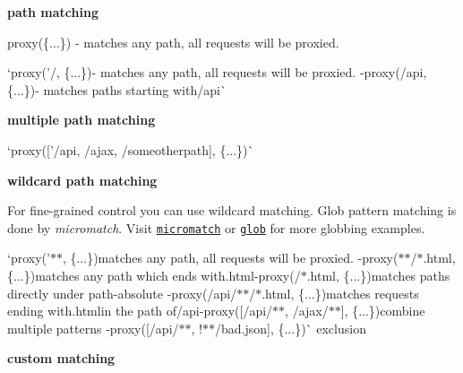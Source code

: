 \begin{DoxyItemize}
\item {\bfseries path matching}
\begin{DoxyItemize}
\item {\ttfamily proxy(\{...\})} -\/ matches any path, all requests will be proxied.
\item `proxy('/\textquotesingle{}, \{...\}){\ttfamily -\/ matches any path, all requests will be proxied. -\/}proxy(\textquotesingle{}/api\textquotesingle{}, \{...\}){\ttfamily -\/ matches paths starting with}/api\`{}
\end{DoxyItemize}
\item {\bfseries multiple path matching}
\begin{DoxyItemize}
\item `proxy(\mbox{[}'/api\textquotesingle{}, \textquotesingle{}/ajax\textquotesingle{}, \textquotesingle{}/someotherpath\textquotesingle{}\mbox{]}, \{...\})\`{}
\end{DoxyItemize}
\item {\bfseries wildcard path matching}

For fine-\/grained control you can use wildcard matching. Glob pattern matching is done by {\itshape micromatch}. Visit \href{https://www.npmjs.com/package/micromatch}{\tt micromatch} or \href{https://www.npmjs.com/package/glob}{\tt glob} for more globbing examples.
\begin{DoxyItemize}
\item `proxy('$\ast$$\ast$\textquotesingle{}, \{...\}){\ttfamily matches any path, all requests will be proxied. -\/}proxy(\textquotesingle{}$\ast$$\ast$/$\ast$.html\textquotesingle{}, \{...\}){\ttfamily matches any path which ends with}.html{\ttfamily  -\/}proxy(\textquotesingle{}/$\ast$.html\textquotesingle{}, \{...\}){\ttfamily matches paths directly under path-\/absolute -\/}proxy(\textquotesingle{}/api/$\ast$$\ast$/$\ast$.html\textquotesingle{}, \{...\}){\ttfamily matches requests ending with}.html{\ttfamily in the path of}/api{\ttfamily  -\/}proxy(\mbox{[}\textquotesingle{}/api/$\ast$$\ast$\textquotesingle{}, \textquotesingle{}/ajax/$\ast$$\ast$\textquotesingle{}\mbox{]}, \{...\}){\ttfamily combine multiple patterns -\/}proxy(\mbox{[}\textquotesingle{}/api/$\ast$$\ast$\textquotesingle{}, \textquotesingle{}!$\ast$$\ast$/bad.json\textquotesingle{}\mbox{]}, \{...\})\`{} exclusion
\end{DoxyItemize}
\item {\bfseries custom matching}


\end{DoxyItemize}

